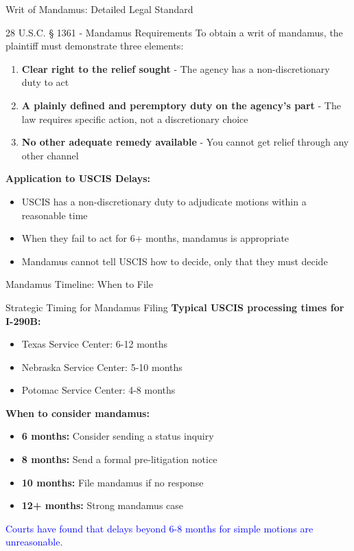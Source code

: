 \documentclass[11pt]{beamer}
\begin{document}
	\begin{frame}{Writ of Mandamus: Detailed Legal Standard}
		\scriptsize
		\begin{block}{28 U.S.C. § 1361 - Mandamus Requirements}
			To obtain a writ of mandamus, the plaintiff must demonstrate three elements:
			\vspace{0.15cm}
			\begin{enumerate}
				\item \textbf{Clear right to the relief sought} - The agency has a non-discretionary duty to act
				\item \textbf{A plainly defined and peremptory duty on the agency's part} - The law requires specific action, not a discretionary choice
				\item \textbf{No other adequate remedy available} - You cannot get relief through any other channel
			\end{enumerate}
			\textbf{Application to USCIS Delays:}
			\begin{itemize}
				\item USCIS has a non-discretionary duty to adjudicate motions within a reasonable time
				\item When they fail to act for 6+ months, mandamus is appropriate
				\item Mandamus cannot tell USCIS how to decide, only that they must decide
			\end{itemize}
		\end{block}
	\end{frame}
	
	\begin{frame}{Mandamus Timeline: When to File}
		\scriptsize
		\begin{block}{Strategic Timing for Mandamus Filing}
			\textbf{Typical USCIS processing times for I-290B:}
			\begin{itemize}
				\item Texas Service Center: 6-12 months
				\item Nebraska Service Center: 5-10 months
				\item Potomac Service Center: 4-8 months
			\end{itemize}
			\textbf{When to consider mandamus:}
			\begin{itemize}
				\item \textbf{6 months:} Consider sending a status inquiry
				\item \textbf{8 months:} Send a formal pre-litigation notice
				\item \textbf{10 months:} File mandamus if no response
				\item \textbf{12+ months:} Strong mandamus case
			\end{itemize}
			\textcolor{blue}{Courts have found that delays beyond 6-8 months for simple motions are unreasonable.}
		\end{block}
	\end{frame}
	
\end{document}

